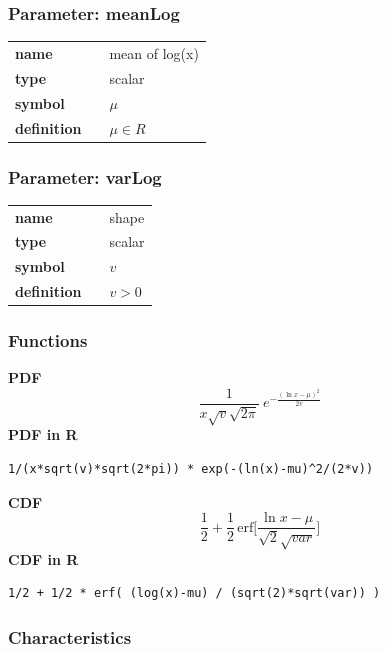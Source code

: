 \subsubsection*{Parameter: meanLog}

\noindent\begin{tabular}{p{2cm}cl}
\textbf{name} & & mean of log(x) \\
\textbf{type} & & scalar \\
\textbf{symbol} & & $\mu$  \\
\textbf{definition} & & $\mu \in R$
\end{tabular}
\subsubsection*{Parameter: varLog}

\noindent\begin{tabular}{p{2cm}cl}
\textbf{name} & & shape \\
\textbf{type} & & scalar \\
\textbf{symbol} & & $v$  \\
\textbf{definition} & & $v > 0$
\end{tabular}
\subsubsection*{Functions}

\smallskip \noindent \hspace{.2cm} \textbf{PDF} 
\begin{equation*}\frac{1}{x\sqrt{v}\sqrt{2\pi}}\ e^{-\frac{\left(\ln x-\mu\right)^2}{2 v}}\end{equation*}
\smallskip \noindent \hspace{.2cm} \textbf{PDF in R}  
\begin{verbatim}1/(x*sqrt(v)*sqrt(2*pi)) * exp(-(ln(x)-mu)^2/(2*v))\end{verbatim}
\smallskip \noindent \hspace{.2cm} \textbf{CDF} 
\begin{equation*}\frac12 + \frac12\,\text{erf}\Big[\frac{\ln x-\mu}{\sqrt{2}\sqrt{var}}\Big]\end{equation*}
\smallskip \noindent \hspace{.2cm} \textbf{CDF in R} 
\begin{verbatim}1/2 + 1/2 * erf( (log(x)-mu) / (sqrt(2)*sqrt(var)) )\end{verbatim}
\smallskip
\subsubsection*{Characteristics}
\smallskip
